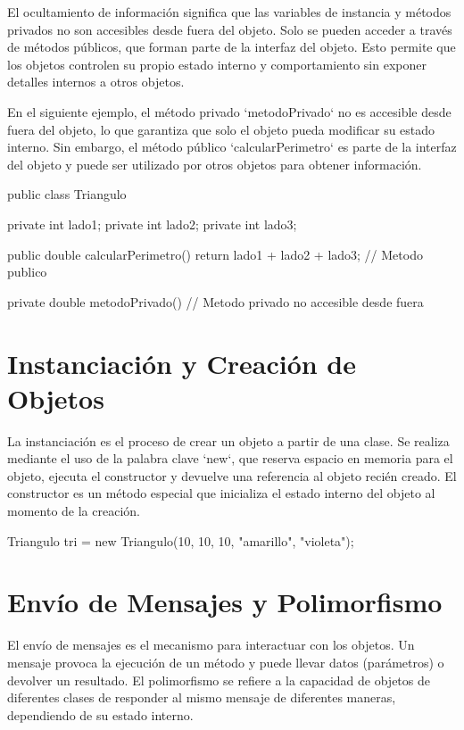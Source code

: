 \documentclass[a4paper]{report}
\begin{document}
El ocultamiento de información significa que las variables de instancia y métodos privados no son accesibles desde fuera del objeto. Solo se pueden acceder a través de métodos públicos, que forman parte de la interfaz del objeto. Esto permite que los objetos controlen su propio estado interno y comportamiento sin exponer detalles internos a otros objetos.

En el siguiente ejemplo, el método privado `metodoPrivado` no es accesible desde fuera del objeto, lo que garantiza que solo el objeto pueda modificar su estado interno. Sin embargo, el método público `calcularPerimetro` es parte de la interfaz del objeto y puede ser utilizado por otros objetos para obtener información.

\begin{roundedlst}
public class Triangulo {
    private int lado1;
    private int lado2;
    private int lado3;

    public double calcularPerimetro() {
        return lado1 + lado2 + lado3; // Metodo publico
    }

    private double metodoPrivado() {
        // Metodo privado no accesible desde fuera
    }
}
\end{roundedlst}

\section{Instanciación y Creación de Objetos}
La instanciación es el proceso de crear un objeto a partir de una clase. Se realiza mediante el uso de la palabra clave `new`, que reserva espacio en memoria para el objeto, ejecuta el constructor y devuelve una referencia al objeto recién creado. El constructor es un método especial que inicializa el estado interno del objeto al momento de la creación.

\begin{roundedlst}
Triangulo tri = new Triangulo(10, 10, 10, 
                "amarillo", "violeta");
\end{roundedlst}

\section{Envío de Mensajes y Polimorfismo}
El envío de mensajes es el mecanismo para interactuar con los objetos. Un mensaje provoca la ejecución de un método y puede llevar datos (parámetros) o devolver un resultado. El polimorfismo se refiere a la capacidad de objetos de diferentes clases de responder al mismo mensaje de diferentes maneras, dependiendo de su estado interno.
\end{document}

